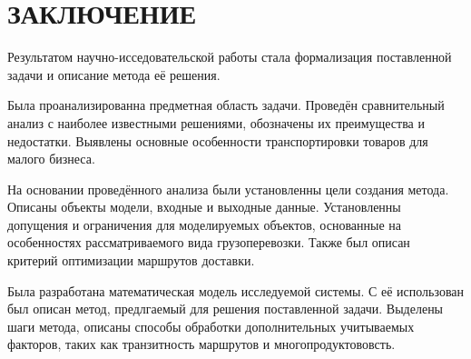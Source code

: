 \section*{ЗАКЛЮЧЕНИЕ}
	Результатом научно-исседовательской работы стала формализация поставленной задачи и описание метода её решения.
	
	Была проанализированна предметная область задачи. Проведён сравнительный анализ с наиболее известными решениями, обозначены их преимущества и недостатки. Выявлены основные особенности транспортировки товаров для малого бизнеса.
	
	На основании проведённого анализа были установленны цели создания метода. Описаны объекты модели, входные и выходные данные. Установленны допущения и ограничения для моделируемых объектов, основанные на особенностях рассматриваемого вида грузоперевозки. Также был описан критерий оптимизации маршрутов доставки.
	
	 Была разработана математическая модель исследуемой системы. С её использован был описан метод, предлгаемый для решения поставленной задачи. Выделены шаги метода, описаны способы обработки дополнительных учитываемых факторов, таких как транзитность маршрутов и многопродуктововсть.
\pagebreak
